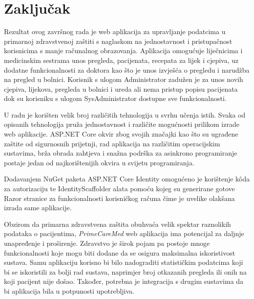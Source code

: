 \section{Zaključak}

Rezultat ovog završnog rada je web aplikacija za upravljanje podatcima u primarnoj zdravstvenoj zaštiti s naglaskom na jednostavnost i pristupačnost korisnicima s manje računalnog obrazovanja. Aplikacija omogućuje liječnicima i medicinskim sestrama unos pregleda, pacijenata, recepata za lijek i cjepiva, uz dodatne funkcionalnosti za doktora kao što je unos izvješća o pregledu i narudžba na pregled u bolnici. Korisnik s ulogom Administrator zadužen je za unos novih cjepiva, lijekova, pregleda u bolnici i ureda ali nema pristup popisu pacijenata dok su korisniku s ulogom SysAdministrator dostupne sve funkcionalnosti.

U radu je korišten velik broj različitih tehnologija u svrhu učenja istih. Svaka od opisanih tehnologija pruža jednostavnost i različite mogućnosti prilikom izrade web aplikacije. ASP.NET Core okvir zbog svojih značajki kao što su ugrađene zaštite od sigurnosnih prijetnji, rad aplikacija na različitim operacijskim sustavima, brža obrada zahtjeva i snažna podrška za asinkrono programiranje postaje jedan od najkorištenijih okvira u svijetu programiranja.
  
Dodavanjem NuGet paketa ASP.NET Core Identity omogućeno je korištenje k\^oda za autorizaciju te IdentityScaffolder alata pomoću kojeg su generirane gotove Razor stranice za funkcionalnosti korisničkog računa čime je uvelike olakšana izrada same aplikacije. 

Obzirom da primarna zdravstvena zaštita obuhvaća velik spektar raznolikih podataka o pacijentima, \textit{PrimeCareMed} web aplikacija ima potencijal za daljnje unapređenje i proširenje. Zdravstvo je širok pojam pa postoje mnoge funkcionalnosti koje mogu biti dodane da se osigura maksimalna iskoristivost sustava. Samu aplikaciju korisno bi bilo nadograditi statističkim podatcima koji bi se iskoristili za bolji rad sustava, naprimjer broj otkazanih pregleda ili onih na koji pacijent nije došao. Također, potrebna je integracija s drugim sustavima da bi aplikacija bila u potpunosti upotrebljiva.


